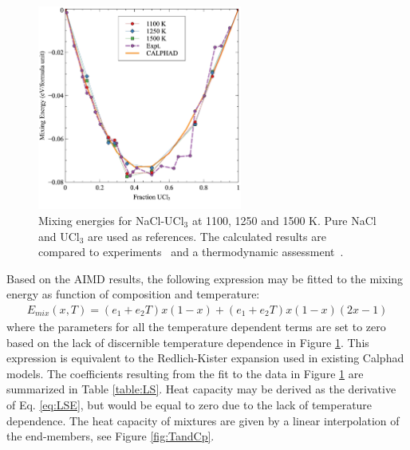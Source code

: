 \documentclass[preprint,3p,10pt,onecolumn,number,sort&compress]{elsarticle}
\begin{document}
{\begin{figure}[htb]
\centering
\includegraphics[width=0.6\textwidth]{fig9.jpg}
\caption{Mixing energies for NaCl-UCl$_3$ at 1100, 1250 and 1500 K. Pure NaCl and UCl$_3$ are used as references. The calculated results are compared to experiments~\cite{Matsuura} and a thermodynamic assessment~\cite{YIN2020}.%
} 
\label{fig:mixing}
\end{figure}

Based on the AIMD results, the following expression may be fitted to the mixing energy as function of composition and temperature:
\begin{equation}
\begin{split}
E_{mix}(x,T)=(e_1+e_2T)x(1-x)+(e_1+e_2T)x(1-x)(2x-1) %
\label{eq:LSE}
\end{split}
\end{equation}
where the parameters for all the temperature dependent terms are set to zero based on the lack of discernible temperature dependence in Figure \ref{fig:mixing}. This expression is equivalent to the Redlich-Kister expansion used in existing Calphad models. The coefficients resulting from the fit to the data in Figure \ref{fig:mixing} are summarized in Table \ref{table:LS}. Heat capacity may be derived as the derivative of Eq. \ref{eq:LSE}, but would be equal to zero due to the lack of temperature dependence. The heat capacity of mixtures are given by a linear interpolation of the end-members, see Figure \ref{fig:TandCp}.

}
\end{document}
